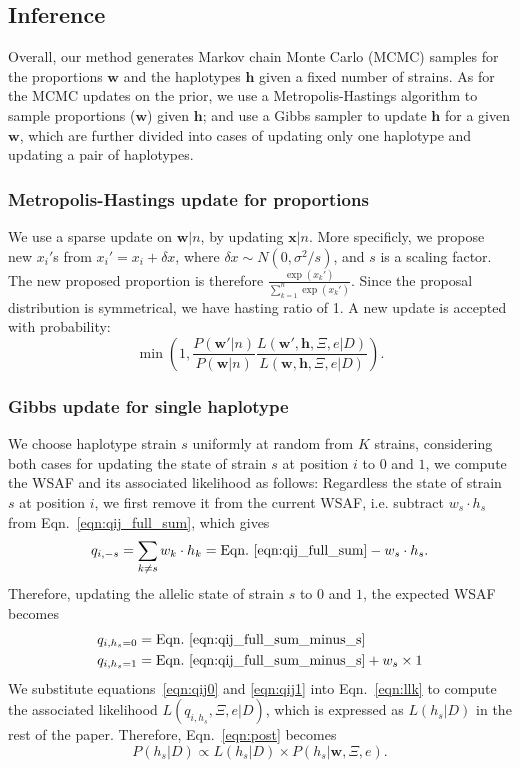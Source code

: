 \documentclass{bioinfo}
\begin{document}
\subsection{Inference}

Overall, our method generates Markov chain Monte Carlo (MCMC) samples for the proportions $\mathbf w$ and the haplotypes $\mathbf h$ given a fixed number of strains. As for the MCMC updates on the prior, we use a Metropolis-Hastings algorithm to sample proportions ($\mathbf w$) given $\mathbf h$; and use a Gibbs sampler to update $\mathbf h$ for a given $\mathbf w$, which are further divided into cases of updating only one haplotype and updating a pair of haplotypes.


\subsubsection{Metropolis-Hastings update for proportions}\label{sec:updateP}

We use a sparse update on $\mathbf{w}|n$, by updating $\mathbf{x}|n$. More specificly, we propose new $x_i'$s from $x_i' = x_i + \delta x$, where $\delta x \sim N(0, \sigma^2/s)$, and $s$ is a scaling factor. The new proposed proportion is therefore $\frac{\exp(x_k')}{\sum_{k=1}^n \exp(x_k')}$. Since the proposal distribution is symmetrical, we have hasting ratio of 1. A new update is accepted with probability:
 $$\min\left(1, \frac{P(\mathbf{w}'|n)}{P(\mathbf{w}|n)} \frac{L(\mathbf{w}', \mathbf{h},\Xi, e|D)}{L(\mathbf{w}, \mathbf{h},\Xi, e|D)}\right).$$


\subsubsection{Gibbs update for single haplotype}
We choose haplotype strain $s$ uniformly at random from $K$ strains, considering both cases for updating the state of strain $s$ at position $i$ to $0$ and $1$, we compute the WSAF and its associated likelihood as follows: Regardless the state of strain $s$ at position $i$, we first remove it from the current WSAF, i.e. subtract $ w_s \cdot h_s$ from Eqn.~\eqref{eqn:qij_full_sum}, which gives
\begin{equation}
q_{i,-s} = \sum_{k\neq s} w_k \cdot h_k = \textrm{Eqn.~\eqref{eqn:qij_full_sum}} -  w_s \cdot h_s. \label{eqn:qij_full_sum_minus_s}
\end{equation}
Therefore, updating the allelic state of strain $s$ to $0$ and $1$, the expected WSAF becomes
\begin{align}
q_{i,h_s=0} & = \textrm{Eqn.~\eqref{eqn:qij_full_sum_minus_s}} \label{eqn:qij0}\\
q_{i,h_s=1} & = \textrm{Eqn.~\eqref{eqn:qij_full_sum_minus_s}} + w_s \times 1 \label{eqn:qij1}
\end{align}
We substitute equations~\eqref{eqn:qij0} and \eqref{eqn:qij1} into Eqn.~\eqref{eqn:llk} to compute the associated likelihood $L(q_{i,h_s}, \Xi, e |D)$, which is expressed as $L(h_s |D)$ in the rest of the paper. Therefore, Eqn.~\eqref{eqn:post} becomes
\begin{equation}
P(h_s |D) \propto  L(h_s |D) \times P(h_s|\mathbf{w}, \Xi, e).\label{eqn:post_hs}
\end{equation}
\end{document}
